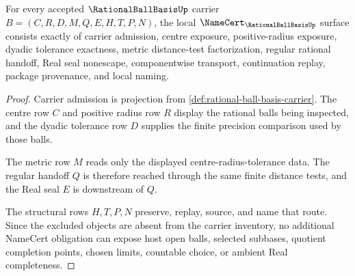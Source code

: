 \begin{theorem}
\label{thm:rational-ball-basis-namecert-obligations}
For every accepted $\RationalBallBasisUp$ carrier $B=(C,R,D,M,Q,E,H,T,P,N)$, the local $\NameCert_{\RationalBallBasisUp}$ surface consists exactly of carrier admission, centre exposure, positive-radius exposure, dyadic tolerance exactness, metric distance-test factorization, regular rational handoff, Real seal nonescape, componentwise transport, continuation replay, package provenance, and local naming.
\end{theorem}
\begin{proof}
Carrier admission is projection from \autoref{def:rational-ball-basis-carrier}. The centre row $C$ and positive radius row $R$ display the rational balls being inspected, and the dyadic tolerance row $D$ supplies the finite precision comparison used by those balls.

The metric row $M$ reads only the displayed centre-radius-tolerance data. The regular handoff $Q$ is therefore reached through the same finite distance tests, and the Real seal $E$ is downstream of $Q$.

The structural rows $H,T,P,N$ preserve, replay, source, and name that route. Since the excluded objects are absent from the carrier inventory, no additional NameCert obligation can expose host open balls, selected subbases, quotient completion points, chosen limits, countable choice, or ambient Real completeness.
\end{proof}

